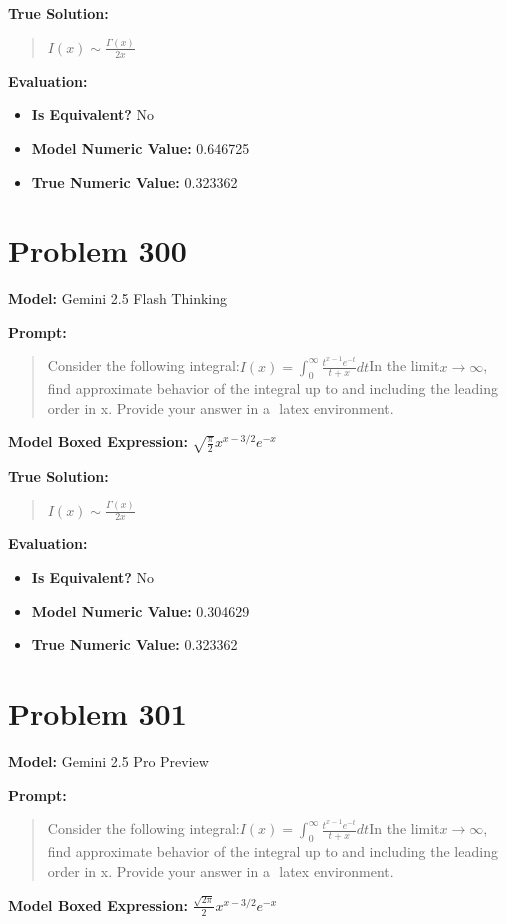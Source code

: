 \documentclass{article}
\begin{document}
{\textbf{True Solution:}
\begin{quote}
$I(x)\sim \frac{\Gamma(x)}{2x}$
\end{quote}

\textbf{Evaluation:}
\begin{itemize}
\item \textbf{Is Equivalent?} No
\item \textbf{Model Numeric Value:} 0.646725
\item \textbf{True Numeric Value:} 0.323362
\end{itemize}
\vspace{1cm}
\section*{Problem 300}
\textbf{Model:} Gemini 2.5 Flash Thinking

\textbf{Prompt:}
\begin{quote}
Consider the following integral:$I(x)=\int_0^\infty \frac{t^{x-1}e^{-t}}{t+x}dt$In the limit$x\to\infty$, find approximate behavior of the integral up to and including the leading order in x. Provide your answer in a $\boxed{}$ latex environment.
\end{quote}
\textbf{Model Boxed Expression:} $\sqrt{\frac{\pi}{2}}x^{x-3/2}e^{-x}$

\textbf{True Solution:}
\begin{quote}
$I(x)\sim \frac{\Gamma(x)}{2x}$
\end{quote}

\textbf{Evaluation:}
\begin{itemize}
\item \textbf{Is Equivalent?} No
\item \textbf{Model Numeric Value:} 0.304629
\item \textbf{True Numeric Value:} 0.323362
\end{itemize}
\vspace{1cm}
\section*{Problem 301}
\textbf{Model:} Gemini 2.5 Pro Preview

\textbf{Prompt:}
\begin{quote}
Consider the following integral:$I(x)=\int_0^\infty \frac{t^{x-1}e^{-t}}{t+x}dt$In the limit$x\to\infty$, find approximate behavior of the integral up to and including the leading order in x. Provide your answer in a $\boxed{}$ latex environment.
\end{quote}
\textbf{Model Boxed Expression:} $\frac{\sqrt{2\pi}}{2} x^{x-3/2}e^{-x}$

}
\end{document}
